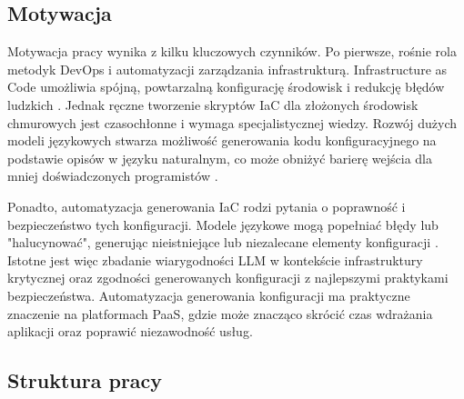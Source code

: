 \subsection{Motywacja}

Motywacja pracy wynika z kilku kluczowych czynników. Po pierwsze, rośnie rola metodyk DevOps i automatyzacji zarządzania infrastrukturą. Infrastructure as Code umożliwia spójną, powtarzalną konfigurację środowisk i redukcję błędów ludzkich \cite{low_repairing_2024}. Jednak ręczne tworzenie skryptów IaC dla złożonych środowisk chmurowych jest czasochłonne i wymaga specjalistycznej wiedzy. Rozwój dużych modeli językowych stwarza możliwość generowania kodu konfiguracyjnego na podstawie opisów w języku naturalnym, co może obniżyć barierę wejścia dla mniej doświadczonych programistów \cite{hu_llm-based_2025}.

Ponadto, automatyzacja generowania IaC rodzi pytania o poprawność i bezpieczeństwo tych konfiguracji. Modele językowe mogą popełniać błędy lub "halucynować", generując nieistniejące lub niezalecane elementy konfiguracji \cite{malul_genkubesec_2024}. Istotne jest więc zbadanie wiarygodności LLM w kontekście infrastruktury krytycznej oraz zgodności generowanych konfiguracji z najlepszymi praktykami bezpieczeństwa. Automatyzacja generowania konfiguracji ma praktyczne znaczenie na platformach PaaS, gdzie może znacząco skrócić czas wdrażania aplikacji oraz poprawić niezawodność usług.

\subsection{Struktura pracy}

